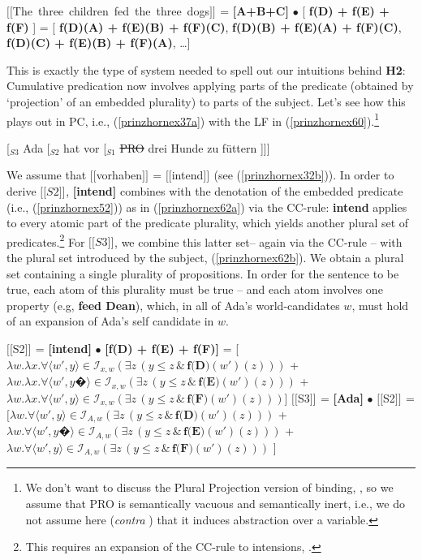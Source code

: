 \documentclass[output=paper,colorlinks,citecolor=brown,
]{langscibook}
\newcommand{\sem}[2]{\mbox{$[\![${#2}$]\!]^{#1}$}} %
\begin{document}
\ea \sem{}{The three children fed the three dogs} = \textbf{[A+B+C]} $\bullet$  [ \textbf{f(D) + f(E) + f(F)} ] =  [ \textbf{f(D)(A) + f(E)(B) + f(F)(C)}, \textbf{f(D)(B) + f(E)(A) + f(F)(C)},  \textbf{f(D)(C) + f(E)(B) + f(F)(A)}, \dots ]
\label{prinzhornex53}
\z

This is exactly the type of system needed to spell out our intuitions behind \textbf{H2}: Cumulative predication now involves applying parts of the predicate (obtained by `projection' of an embedded plurality) to parts of the subject. Let's see how this plays out in PC, i.e., (\ref{prinzhornex37a}) with the LF in (\ref{prinzhornex60}).\footnote{We don't want to discuss the  Plural Projection version of binding, \citep{Haslinger:2020d}, so we assume that PRO is semantically vacuous and semantically inert, i.e., we do not assume here (\textit{contra} \citealt{Heim:1998}) that it induces abstraction over a variable.} 

\ea  \label{prinzhornex60} [$_{S3}$ Ada [$_{S2}$ hat vor [$_{S1}$ \sout{PRO} drei Hunde zu f\"{u}ttern ]]]  \z

We assume that \sem{}{vorhaben} = \sem{}{intend} (see (\ref{prinzhornex32b})). In order to derive \sem{}{$S2$},  \textbf{[intend]} combines with the denotation of the embedded predicate (i.e., (\ref{prinzhornex52})) as in (\ref{prinzhornex62a}) via the CC-rule: \textbf{intend} applies to every atomic part of the predicate plurality, which yields another plural set of predicates.\footnote{This requires an expansion of the CC-rule to  intensions, \citep{Schmitt:2019a}.} For \sem{}{$S3$}, we combine this latter set-- again via the CC-rule -- with the plural set introduced by the subject, (\ref{prinzhornex62b}). We obtain a plural set containing a single plurality of propositions. In order for the sentence to be true, each atom of this plurality must be true -- and each atom involves one property (e.g, {\bf feed Dean}), which, in all of Ada's world-candidates $w$, must hold of an expansion of Ada's self candidate in $w$.




\ea
\ea  \sem{}{S2} = \textbf{[intend]} $\bullet$ \textbf{[f(D) + f(E) + f(F)]} = 
 [$\lambda w. \lambda x. \forall \langle w' ,y \rangle \in \mathcal{I}_{x,w} (\exists  z \,(y \le z\, \& \,\textbf{f(D)}(w')(z)))$ +
 $\lambda w. \lambda x. \forall \langle w' ,y�\rangle \in \mathcal{I}_{x,w} (\exists  z \,(y \le z\, \& \,\textbf{f(E)}(w')(z)))$ +
 $\lambda w. \lambda x. \forall \langle w' ,y \rangle \in \mathcal{I}_{x,w} (\exists  z \,(y \le z\, \& \,\textbf{f(F)}(w')(z)))$]
\label{prinzhornex62a}
\ex \sem{}{S3} = \textbf{[Ada]} $\bullet$ \sem{}{S2} = \\
 $[\lambda w.  \forall \langle w' ,y \rangle \in \mathcal{I}_{A,w} (\exists  z \,(y \le z\, \& \,\textbf{f(D)}(w')(z)))$ +
 $\lambda w.  \forall \langle w' ,y�\rangle \in \mathcal{I}_{A,w} (\exists  z \,(y \le z\, \& \,\textbf{f(E)}(w')(z)))$ +
 $\lambda w.  \forall \langle w' ,y \rangle \in \mathcal{I}_{A,w} (\exists  z \,(y \le z\, \& \,\textbf{f(F)}(w')(z)))$ ]
\label{prinzhornex62b}
\z\z
\end{document}
